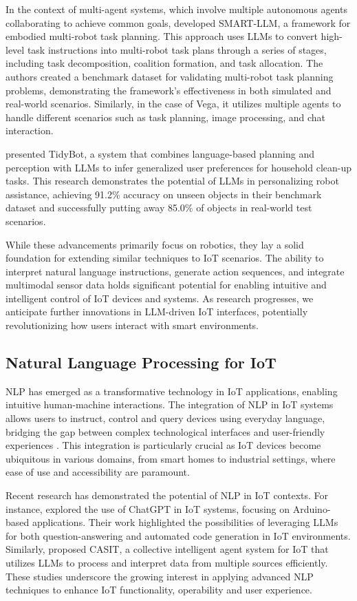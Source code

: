 \documentclass{ieeeaccess}
\begin{document}
In the context of multi-agent systems, which involve multiple autonomous agents collaborating to achieve common goals, \citet{kannan2024smartllmsmartmultiagentrobot} developed SMART-LLM, a framework for embodied multi-robot task planning. This approach uses LLMs to convert high-level task instructions into multi-robot task plans through a series of stages, including task decomposition, coalition formation, and task allocation. The authors created a benchmark dataset for validating multi-robot task planning problems, demonstrating the framework's effectiveness in both simulated and real-world scenarios. Similarly, in the case of Vega, it utilizes multiple agents to handle different scenarios such as task planning, image processing, and chat interaction.

\citet{Wu2023} presented TidyBot, a system that combines language-based planning and perception with LLMs to infer generalized user preferences for household clean-up tasks. This research demonstrates the potential of LLMs in personalizing robot assistance, achieving 91.2\% accuracy on unseen objects in their benchmark dataset and successfully putting away 85.0\% of objects in real-world test scenarios.

While these advancements primarily focus on robotics, they lay a solid foundation for extending similar techniques to IoT scenarios. The ability to interpret natural language instructions, generate action sequences, and integrate multimodal sensor data holds significant potential for enabling intuitive and intelligent control of IoT devices and systems. As research progresses, we anticipate further innovations in LLM-driven IoT interfaces, potentially revolutionizing how users interact with smart environments.

\subsection{Natural Language Processing for IoT}
NLP has emerged as a transformative technology in IoT applications, enabling intuitive human-machine interactions. The integration of NLP in IoT systems allows users to instruct, control and query devices using everyday language, bridging the gap between complex technological interfaces and user-friendly experiences \cite{10.1145/3643505}. This integration is particularly crucial as IoT devices become ubiquitous in various domains, from smart homes to industrial settings, where ease of use and accessibility are paramount.

Recent research has demonstrated the potential of NLP in IoT contexts. For instance, \citet{10315791} explored the use of ChatGPT in IoT systems, focusing on Arduino-based applications. Their work highlighted the possibilities of leveraging LLMs for both question-answering and automated code generation in IoT environments. Similarly, \citet{10439991} proposed CASIT, a collective intelligent agent system for IoT that utilizes LLMs to process and interpret data from multiple sources efficiently. These studies underscore the growing interest in applying advanced NLP techniques to enhance IoT functionality, operability and user experience.
\end{document}

